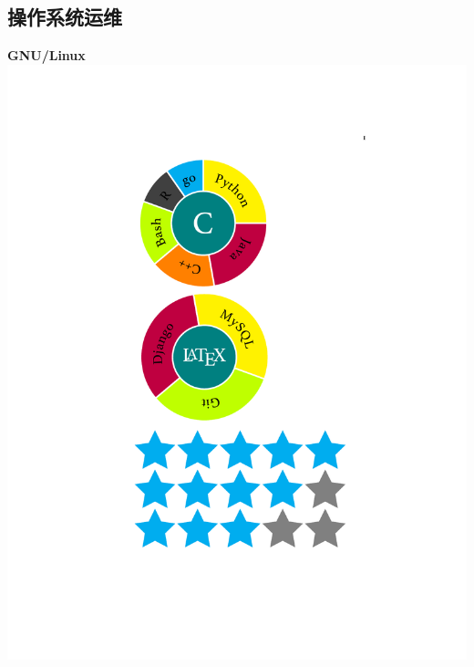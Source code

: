 \documentclass[]{friggeri-cv}
\begin{document}
\begin{aside}
  \section{\cuti 操作系统运维}
    \textbf{GNU/Linux}\includegraphics[scale=0.16]{img/5stars}

\end{aside}
\end{document}
